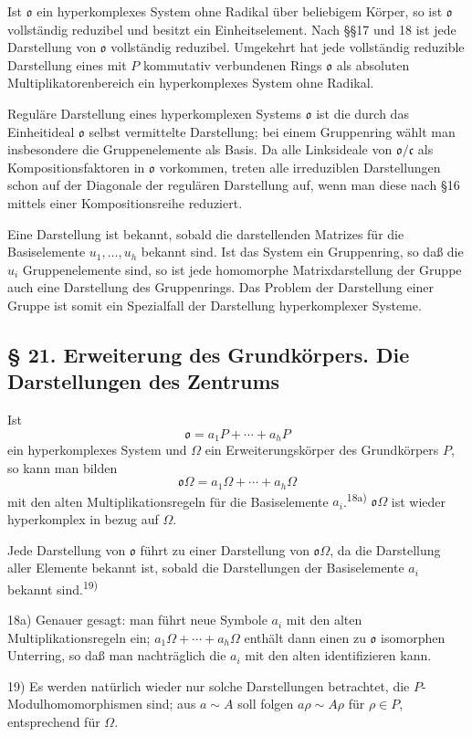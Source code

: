 \documentclass[11pt]{article}
\providecommand{\mo}{\mathfrak{o}}
\providecommand{\mc}{\mathfrak{c}}
\begin{document}
Ist $\mo$ ein hyperkomplexes System ohne Radikal über beliebigem Körper, so ist $\mo$ vollständig reduzibel und besitzt ein Einheitselement. Nach §§17 und 18 ist jede Darstellung von $\mo$ vollständig reduzibel. Umgekehrt hat jede vollständig reduzible Darstellung eines mit $P$ kommutativ verbundenen Rings $\mo$ als absoluten Multiplikatorenbereich ein hyperkomplexes System ohne Radikal.

Reguläre Darstellung eines hyperkomplexen Systems $\mo$ ist die durch das Einheitideal $\mo$ selbst vermittelte Darstellung; bei einem Gruppenring wählt man insbesondere die Gruppenelemente als Basis. Da alle Linksideale von $\mo/\mc$ als Kompositionsfaktoren in $\mo$ vorkommen, treten alle irreduziblen Darstellungen schon auf der Diagonale der regulären Darstellung auf, wenn man diese nach §16 mittels einer Kompositionsreihe reduziert.

Eine Darstellung ist bekannt, sobald die darstellenden Matrizes für die Basiselemente $u_1,\ldots,u_h$ bekannt sind. Ist das System ein Gruppenring, so daß die $u_i$ Gruppenelemente sind, so ist jede homomorphe Matrixdarstellung der Gruppe auch eine Darstellung des Gruppenrings. Das Problem der Darstellung einer Gruppe ist somit ein Spezialfall der Darstellung hyperkomplexer Systeme.

\subsection*{§ 21. Erweiterung des Grundkörpers. Die Darstellungen des Zentrums}
Ist
\[
        \mo=a_1P+\cdots+a_hP
\]
ein hyperkomplexes System und $\Omega$ ein Erweiterungskörper des Grundkörpers $P$, so kann man bilden
\[
        \mo\Omega=a_1\Omega+\cdots+a_h\Omega
\]
mit den alten Multiplikationsregeln für die Basiselemente $a_i$.\textsuperscript{18a)} $\mo\Omega$ ist wieder hyperkomplex in bezug auf $\Omega$.

Jede Darstellung von $\mo$ führt zu einer Darstellung von $\mo\Omega$, da die Darstellung aller Elemente bekannt ist, sobald die Darstellungen der Basiselemente $a_i$ bekannt sind.\textsuperscript{19)}

{\footnotesize\noindent 18a) Genauer gesagt: man führt neue Symbole $a_i$ mit den alten Multiplikationsregeln ein; $a_1\Omega+\cdots+a_h\Omega$ enthält dann einen zu $\mo$ isomorphen Unterring, so daß man nachträglich die $a_i$ mit den alten identifizieren kann.\par
19) Es werden natürlich wieder nur solche Darstellungen betrachtet, die $P$-Modulhomomorphismen sind; aus $a\sim A$ soll folgen $a\rho\sim A\rho$ für $\rho\in P$, entsprechend für $\Omega$.\par}
\end{document}
